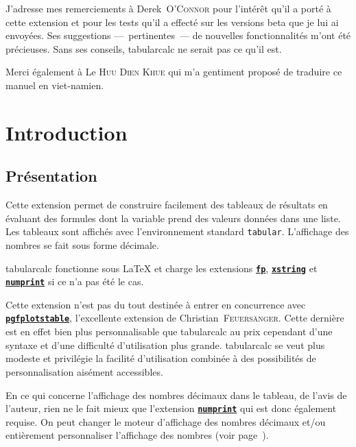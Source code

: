 \documentclass[a4paper,10pt]{article}
\newcommand\tbcalc{\textsf{tabularcalc}\xspace}
\begin{document}
\tableofcontents

\bigskip
J'adresse mes remerciements à Derek~\textsc{O'Connor} pour l'intérêt qu'il a porté à cette extension et pour les tests qu'il a effecté sur les versions beta que je lui ai envoyées. Ses suggestions ---~pertinentes~--- de nouvelles fonctionnalités m'ont été précieuses. Sans ses conseils, \tbcalc ne serait pas ce qu'il est.\medskip

Merci également à Le \textsc{Huu Dien Khue} qui m'a gentiment proposé de traduire ce manuel en viet-namien.

\section{Introduction}
\subsection{Présentation}
Cette extension permet de construire facilement des tableaux de résultats en évaluant des formules dont la variable prend des valeurs données dans une liste. Les tableaux sont affichés avec l'environnement standard \verb|tabular|. L'affichage des nombres se fait sous forme décimale.

\tbcalc fonctionne sous \LaTeX{} et charge les extensions \href{http://www.ctan.org/tex-archive/macros/latex/contrib/fp/}{\texttt{\textbf{fp}}}, \href{http://www.ctan.org/tex-archive/macros/latex/contrib/xstring/}{\texttt{\textbf{xstring}}} et \href{http://www.ctan.org/tex-archive/macros/latex/contrib/numprint/}{\texttt{\textbf{numprint}}} si ce n'a pas été le cas.

Cette extension n'est pas du tout destinée à entrer en concurrence avec \href{http://www.ctan.org/tex-archive/graphics/pgf/contrib/pgfplots/}{\texttt{\textbf{pgfplotstable}}}, l'excellente extension de Christian~\textsc{Feuers\"anger}. Cette dernière est en effet bien plus personnalisable que \tbcalc au prix cependant d'une syntaxe et d'une difficulté d'utilisation plus grande. \tbcalc se veut plus modeste et privilégie la facilité d'utilisation combinée à des possibilités de personnalisation aisément accessibles.\medskip

En ce qui concerne l'affichage des nombres décimaux dans le tableau, de l'avis de l'auteur, rien ne le fait mieux que l'extension \href{http://www.ctan.org/tex-archive/macros/latex/contrib/numprint/}{\texttt{\textbf{numprint}}} qui est donc également requise. On peut changer le moteur d'affichage des nombres décimaux et/ou entièrement personnaliser l'affichage des nombres (voir page~\pageref{persoaffichage}).
\end{document}

